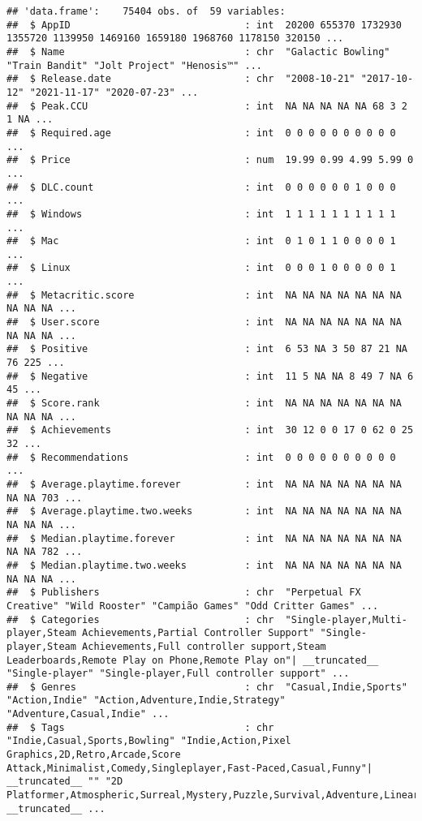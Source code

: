 \documentclass[
]{article}
\begin{document}
\begin{verbatim}
## 'data.frame':    75404 obs. of  59 variables:
##  $ AppID                              : int  20200 655370 1732930 1355720 1139950 1469160 1659180 1968760 1178150 320150 ...
##  $ Name                               : chr  "Galactic Bowling" "Train Bandit" "Jolt Project" "Henosis™" ...
##  $ Release.date                       : chr  "2008-10-21" "2017-10-12" "2021-11-17" "2020-07-23" ...
##  $ Peak.CCU                           : int  NA NA NA NA NA 68 3 2 1 NA ...
##  $ Required.age                       : int  0 0 0 0 0 0 0 0 0 0 ...
##  $ Price                              : num  19.99 0.99 4.99 5.99 0 ...
##  $ DLC.count                          : int  0 0 0 0 0 0 1 0 0 0 ...
##  $ Windows                            : int  1 1 1 1 1 1 1 1 1 1 ...
##  $ Mac                                : int  0 1 0 1 1 0 0 0 0 1 ...
##  $ Linux                              : int  0 0 0 1 0 0 0 0 0 1 ...
##  $ Metacritic.score                   : int  NA NA NA NA NA NA NA NA NA NA ...
##  $ User.score                         : int  NA NA NA NA NA NA NA NA NA NA ...
##  $ Positive                           : int  6 53 NA 3 50 87 21 NA 76 225 ...
##  $ Negative                           : int  11 5 NA NA 8 49 7 NA 6 45 ...
##  $ Score.rank                         : int  NA NA NA NA NA NA NA NA NA NA ...
##  $ Achievements                       : int  30 12 0 0 17 0 62 0 25 32 ...
##  $ Recommendations                    : int  0 0 0 0 0 0 0 0 0 0 ...
##  $ Average.playtime.forever           : int  NA NA NA NA NA NA NA NA NA 703 ...
##  $ Average.playtime.two.weeks         : int  NA NA NA NA NA NA NA NA NA NA ...
##  $ Median.playtime.forever            : int  NA NA NA NA NA NA NA NA NA 782 ...
##  $ Median.playtime.two.weeks          : int  NA NA NA NA NA NA NA NA NA NA ...
##  $ Publishers                         : chr  "Perpetual FX Creative" "Wild Rooster" "Campião Games" "Odd Critter Games" ...
##  $ Categories                         : chr  "Single-player,Multi-player,Steam Achievements,Partial Controller Support" "Single-player,Steam Achievements,Full controller support,Steam Leaderboards,Remote Play on Phone,Remote Play on"| __truncated__ "Single-player" "Single-player,Full controller support" ...
##  $ Genres                             : chr  "Casual,Indie,Sports" "Action,Indie" "Action,Adventure,Indie,Strategy" "Adventure,Casual,Indie" ...
##  $ Tags                               : chr  "Indie,Casual,Sports,Bowling" "Indie,Action,Pixel Graphics,2D,Retro,Arcade,Score Attack,Minimalist,Comedy,Singleplayer,Fast-Paced,Casual,Funny"| __truncated__ "" "2D Platformer,Atmospheric,Surreal,Mystery,Puzzle,Survival,Adventure,Linear,Singleplayer,Experimental,Platformer"| __truncated__ ...

\end{verbatim}
\end{document}
